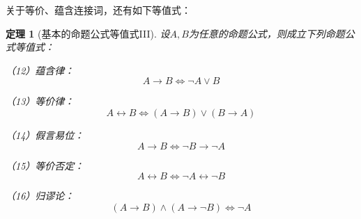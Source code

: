 \documentclass[a4paper, 11pt]{article} %
\newtheorem{thm}{定理}[subsection]
\begin{document}
关于等价、蕴含连接词，还有如下等值式：

\begin{thm}[基本的命题公式等值式III]\label{prop-dengzhi-gongshi-3}
设$A,B$为任意的命题公式，则成立下列命题公式等值式：

（12）蕴含律：
$$A\rightarrow B\Leftrightarrow\neg A\vee B$$

（13）等价律：
$$A\leftrightarrow B\Leftrightarrow (A\rightarrow B)\vee(B\rightarrow A)$$

（14）假言易位：
$$A\rightarrow B\Leftrightarrow\neg B\rightarrow\neg A$$

（15）等价否定：
$$A\leftrightarrow B\Leftrightarrow\neg A\leftrightarrow\neg B$$

（16）归谬论：
$$(A\rightarrow B)\wedge(A\rightarrow\neg B)\Leftrightarrow\neg A$$
\end{thm}
\end{document}
